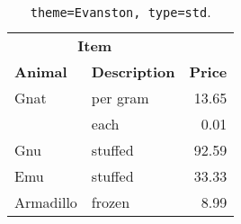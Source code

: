\begin{table}[!htb]
\large
\centering
\begin{tabular}{llr}
\toprule
\multicolumn{2}{c}{\textbf{Item}} &                      \\
\cmidrule(r){1-2}
\textbf{Animal}                   & \textbf{Description} & \textbf{Price} \\
\midrule[\heavyrulewidth]
Gnat      & per gram & 13.65 \\
          & each     & 0.01  \\
Gnu       & stuffed  & 92.59 \\
Emu       & stuffed  & 33.33 \\
Armadillo & frozen   & 8.99  \\
\bottomrule
\end{tabular}
\caption[\texttt{theme=Evanston, type=std}]{\texttt{theme=Evanston, type=std}. }
\end{table}
